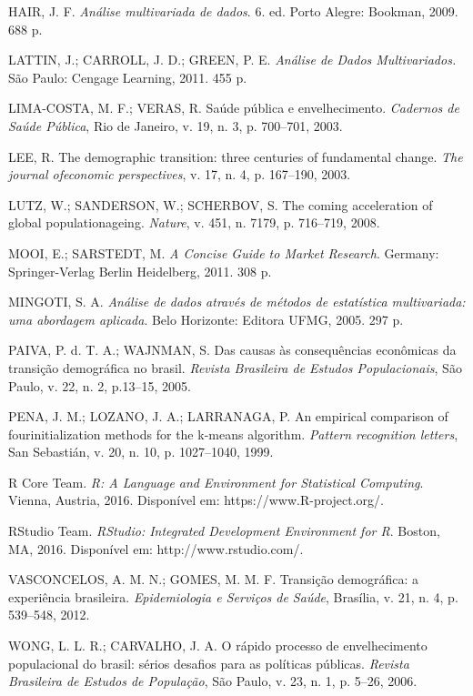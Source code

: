 \documentclass[10pt,twoside]{article}
\begin{document}
\begin{thebibliography}{}
		HAIR, J. F.  \textit{Análise multivariada de dados}. 6. ed. Porto Alegre: Bookman, 2009. 688 p.
		
		LATTIN, J.; CARROLL, J. D.; GREEN, P. E. \textit{Análise de Dados Multivariados.} São Paulo: Cengage Learning, 2011. 455 p.
		
		LIMA-COSTA, M. F.; VERAS, R. Saúde pública e envelhecimento. \textit{Cadernos de Saúde Pública}, Rio de Janeiro, v. 19, n. 3, p. 700–701, 2003.
		
		LEE, R. The demographic transition: three centuries of fundamental change. \textit{The journal ofeconomic perspectives}, v. 17, n. 4, p. 167–190, 2003.
		
		LUTZ, W.; SANDERSON, W.; SCHERBOV, S. The coming acceleration of global populationageing. \textit{Nature}, v. 451, n. 7179, p. 716–719, 2008.
		
		MOOI, E.;  SARSTEDT, M. \textit{A Concise Guide to Market Research}. Germany: Springer-Verlag Berlin Heidelberg, 2011. 308 p.
		
		MINGOTI, S. A. \textit{Análise de dados através de métodos de estatística multivariada: uma abordagem aplicada}. Belo Horizonte: Editora UFMG, 2005. 297 p.
		
		PAIVA, P. d. T. A.; WAJNMAN, S. Das causas às consequências econômicas da transição demográfica no brasil. \textit{Revista Brasileira de Estudos Populacionais}, São Paulo, v. 22, n. 2, p.13–15, 2005.
		
		PENA, J. M.;  LOZANO, J. A.;  LARRANAGA, P. An empirical comparison of fourinitialization methods for the k-means algorithm. \textit{Pattern recognition letters}, San Sebastián, v. 20, n. 10, p. 1027–1040, 1999.
		
		R Core Team. \textit{R: A Language and Environment for Statistical Computing}. Vienna, Austria, 2016. Disponível em: https://www.R-project.org/.
		
		RStudio Team. \textit{RStudio: Integrated Development Environment for R}. Boston, MA, 2016. Disponível em: http://www.rstudio.com/.
		
		VASCONCELOS, A. M. N.; GOMES, M. M. F. Transição demográfica:  a experiência brasileira. \textit{Epidemiologia e Serviços de Saúde}, Brasília, v. 21, n. 4, p. 539–548, 2012.
		
		WONG, L. L. R.; CARVALHO, J. A. O rápido processo de envelhecimento populacional do brasil: sérios desafios para as políticas públicas. \textit{Revista Brasileira de Estudos de População}, São Paulo, v. 23, n. 1, p. 5–26, 2006.
		

\end{thebibliography}
\end{document}
